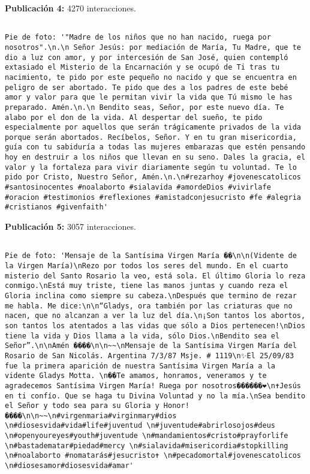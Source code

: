 \documentclass{article}
\begin{document}
\textbf{Publicación 4:} 4270 interacciones.
\cprotect\begin{verbatim}

Pie de foto: '"Madre de los niños que no han nacido, ruega por nosotros".\n.\n Señor Jesús: por mediación de María, Tu Madre, que te dio a luz con amor, y por intercesión de San José, quien contempló extasiado el Misterio de la Encarnación y se ocupó de Ti tras tu nacimiento, te pido por este pequeño no nacido y que se encuentra en peligro de ser abortado. Te pido que des a los padres de este bebé amor y valor para que le permitan vivir la vida que Tú mismo le has preparado. Amén.\n.\n Bendito seas, Señor, por este nuevo día. Te alabo por el don de la vida. Al despertar del sueño, te pido especialmente por aquellos que serán trágicamente privados de la vida porque serán abortados. Recíbelos, Señor. Y en tu gran misericordia, guía con tu sabiduría a todas las mujeres embarazas que estén pensando hoy en destruir a los niños que llevan en su seno. Dales la gracia, el valor y la fortaleza para vivir diariamente según tu voluntad. Te lo pido por Cristo, Nuestro Señor, Amén.\n.\n#rezarhoy #jovenescatolicos #santosinocentes #noalaborto #sialavida #amordeDios #vivirlafe #oracion #testimonios #reflexiones #amistadconjesucristo #fe #alegria #cristianos #givenfaith'
\end{verbatim}


\textbf{Publicación 5:} 3057 interacciones.
\cprotect\begin{verbatim}

Pie de foto: 'Mensaje de la Santísima Virgen María ��\n\n(Vidente de la Virgen María)\nRezo por todos los seres del mundo. En el cuarto misterio del Santo Rosario la veo, está sola. El último Gloria lo reza conmigo.\nEstá muy triste, tiene las manos juntas y cuando reza el Gloria inclina como siempre su cabeza.\nDespués que termino de rezar me habla. Me dice:\n\n“Gladys, ora también por las criaturas que no nacen, que no alcanzan a ver la luz del día.\n¡Son tantos los abortos, son tantos los atentados a las vidas que sólo a Dios pertenecen!\nDios tiene la vida y Dios llama a la vida, sólo Dios.\nBendito sea el Señor”.\n\nAmén ����\n\n~~\nMensaje de la Santísima Virgen María del Rosario de San Nicolás. Argentina 7/3/87 Msje. # 1119\n✨El 25/09/83 fue la primera aparición de nuestra Santísima Virgen María a la vidente Gladys Motta. \n��Te amamos, honramos, veneramos y te agradecemos Santísima Virgen María! Ruega por nosotros������❤️\n✝️Jesús en ti confío. Que se haga tu Divina Voluntad y no la mía.\nSea bendito el Señor y todo sea para su Gloria y Honor!����\n\n~~\n#virgenmaria#virginmary#dios \n#diosesvida#vida#life#juventud \n#juventude#abrirlosojos#deus \n#openyoureyes#youth#juventude \n#mandamientos#cristo#prayforlife \n#bastadematar#piedad#mercy \n#sialavida#misericordia#stopkilling \n#noalaborto #nomatarás#jesucristo✝ \n#pecadomortal#jovenescatolicos \n#diosesamor#diosesvida#amar'
\end{verbatim}
\end{document}
